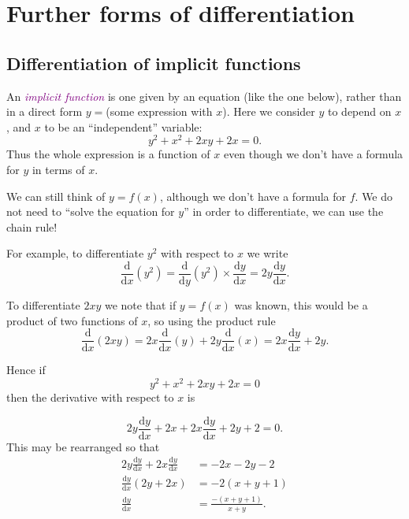 \documentclass[
  english,
  11pt,
  oneside]{book}
\newcommand{\slide}{}
\theoremstyle{definition}
\theoremstyle{definition}
\theoremstyle{definition}
\theoremstyle{definition}
\theoremstyle{remark}
\begin{document}
\section{Further forms of differentiation}\label{further-forms-of-differentiation}

\subsection{Differentiation of implicit functions}\label{differentiation-of-implicit-functions}

An \textcolor{purple}{\em implicit function} is one given by an equation (like the one below), rather than in a direct form \(y=\)(some expression with \(x\)). Here we consider \(y\) to depend on \(x\), and \(x\) to be an ``independent'' variable:
\[y^2 + x^2 + 2xy + 2x = 0.\]
Thus the whole expression is a function of \(x\) even though we don't have a formula for \(y\) in terms of \(x\).

We can still think of \(y=f(x)\), although we don't have a formula for \(f\). We do not need to ``solve the equation for \(y\)'' in order to differentiate, we can use the chain rule!

\slide

For example, to differentiate \(y^2\) with respect to \(x\) we write
\[\frac{\mathrm{d}}{\mathrm{d} x}(y^2) = \frac{\mathrm{d}}{\mathrm{d} y}(y^2)\times\frac{\mathrm{d} y}{\mathrm{d} x}= 2y\frac{\mathrm{d} y}{\mathrm{d} x}.\]
\slide
To differentiate \(2xy\) we note that if \(y=f(x)\) was known, this would be a product of two functions of \(x\), so using the product rule
\[\frac{\mathrm{d}}{\mathrm{d} x}(2xy) = 2x\frac{\mathrm{d}}{\mathrm{d} x}(y)+2y\frac{\mathrm{d}}{\mathrm{d} x}(x) = 2x\frac{\mathrm{d} y}{\mathrm{d} x} + 2y.\]
\slide
Hence if
\[y^2 + x^2 + 2xy + 2x = 0\]
then the derivative with respect to \(x\) is

\begin{notslides}

\[2y\frac{\mathrm{d} y}{\mathrm{d} x} + 2x+2x\frac{\mathrm{d} y}{\mathrm{d} x} +2y+2 = 0.\]
This may be rearranged so that
\begin{align*}
2y\frac{\mathrm{d} y}{\mathrm{d} x}+2x\frac{\mathrm{d} y}{\mathrm{d} x} &= -2x-2y-2\\
\frac{\mathrm{d} y}{\mathrm{d} x}(2y+2x) &= -2(x+y+1)\\
\frac{\mathrm{d} y}{\mathrm{d} x} &= \frac{-(x+y+1)}{x+y}.
\end{align*}

\end{notslides}
\end{document}
